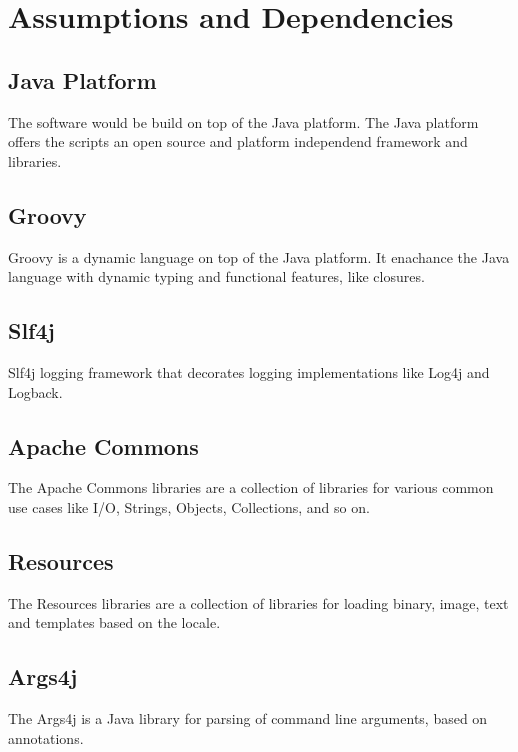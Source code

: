 \section{Assumptions and Dependencies}

\subsection*{Java Platform}

The software would be build on top of the Java\cite{java13} platform. The Java platform
offers the scripts an open source and platform independend framework
and libraries.

\subsection*{Groovy}

Groovy\cite{groovy13}
is a dynamic language on top of the Java platform. It enachance the Java
language with dynamic typing and functional features, like closures.

\subsection*{Slf4j}

Slf4j\cite{slf4j13} logging framework that decorates logging implementations like 
Log4j\cite{log4j13} and Logback\cite{logback13}.

\subsection*{Apache Commons}

The Apache Commons\cite{commons13} libraries are a collection of libraries
for various common use cases like I/O, Strings, Objects, Collections, and so on.

\subsection*{Resources}

The Resources\cite{resources13} libraries are a collection of libraries
for loading binary, image, text and templates based on the locale.

\subsection*{Args4j}

The Args4j\cite{args4j13} is a Java library for parsing of command line arguments,
based on annotations.
